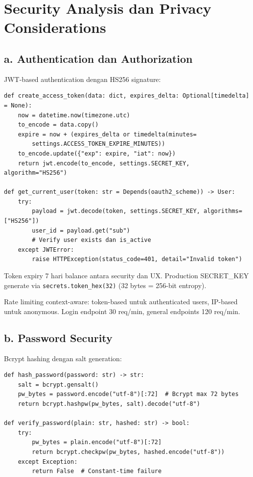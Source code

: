 \documentclass[12pt,a4paper]{article}
\begin{document}
\newpage

\section{Security Analysis dan Privacy Considerations}

\subsection*{a. Authentication dan Authorization}

JWT-based authentication dengan HS256 signature:

\begin{lstlisting}
def create_access_token(data: dict, expires_delta: Optional[timedelta] = None):
    now = datetime.now(timezone.utc)
    to_encode = data.copy()
    expire = now + (expires_delta or timedelta(minutes=
        settings.ACCESS_TOKEN_EXPIRE_MINUTES))
    to_encode.update({"exp": expire, "iat": now})
    return jwt.encode(to_encode, settings.SECRET_KEY, algorithm="HS256")

def get_current_user(token: str = Depends(oauth2_scheme)) -> User:
    try:
        payload = jwt.decode(token, settings.SECRET_KEY, algorithms=["HS256"])
        user_id = payload.get("sub")
        # Verify user exists dan is_active
    except JWTError:
        raise HTTPException(status_code=401, detail="Invalid token")
\end{lstlisting}

Token expiry 7 hari balance antara security dan UX. Production SECRET\_KEY generate via \texttt{secrets.token\_hex(32)} (32 bytes = 256-bit entropy).

Rate limiting context-aware: token-based untuk authenticated users, IP-based untuk anonymous. Login endpoint 30 req/min, general endpoints 120 req/min.

\subsection*{b. Password Security}

Bcrypt hashing dengan salt generation:

\begin{lstlisting}
def hash_password(password: str) -> str:
    salt = bcrypt.gensalt()
    pw_bytes = password.encode("utf-8")[:72]  # Bcrypt max 72 bytes
    return bcrypt.hashpw(pw_bytes, salt).decode("utf-8")

def verify_password(plain: str, hashed: str) -> bool:
    try:
        pw_bytes = plain.encode("utf-8")[:72]
        return bcrypt.checkpw(pw_bytes, hashed.encode("utf-8"))
    except Exception:
        return False  # Constant-time failure
\end{lstlisting}
\end{document}
